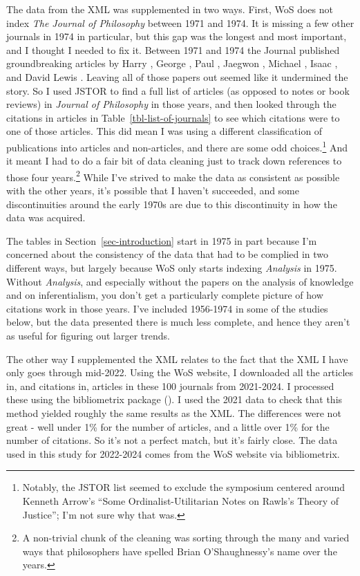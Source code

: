\documentclass[
]{ergoclass}
\begin{document}
The data from the XML was supplemented in two ways. First, WoS does not
index \emph{The Journal of Philosophy} between 1971 and 1974. It is
missing a few other journals in 1974 in particular, but this gap was the
longest and most important, and I thought I needed to fix it. Between
1971 and 1974 the Journal published groundbreaking articles by Harry
\citet{Frankfurt1971}, George \citet{Boolos1971}, Paul
\citet{Benacerraf1973}, Jaegwon \citet{Kim1973}, Michael
\citet{Friedman1974}, Isaac \citet{Levi1974}, and David Lewis
\citetext{\citeyear{Lewis1971cen}; \citeyear{Lewis1973ben}}. Leaving all
of those papers out seemed like it undermined the story. So I used JSTOR
to find a full list of articles (as opposed to notes or book reviews) in
\emph{Journal of Philosophy} in those years, and then looked through the
citations in articles in Table~\ref{tbl-list-of-journals} to see which
citations were to one of those articles. This did mean I was using a
different classification of publications into articles and non-articles,
and there are some odd choices.\footnote{Notably, the JSTOR list seemed
  to exclude the symposium centered around Kenneth Arrow's ``Some
  Ordinalist-Utilitarian Notes on Rawls's Theory of Justice''; I'm not
  sure why that was.} And it meant I had to do a fair bit of data
cleaning just to track down references to those four years.\footnote{A
  non-trivial chunk of the cleaning was sorting through the many and
  varied ways that philosophers have spelled Brian O'Shaughnessy's name
  over the years.} While I've strived to make the data as consistent as
possible with the other years, it's possible that I haven't succeeded,
and some discontinuities around the early 1970s are due to this
discontinuity in how the data was acquired.

The tables in Section~\ref{sec-introduction} start in 1975 in part
because I'm concerned about the consistency of the data that had to be
complied in two different ways, but largely because WoS only starts
indexing \emph{Analysis} in 1975. Without \emph{Analysis}, and
especially without the papers on the analysis of knowledge and on
inferentialism, you don't get a particularly complete picture of how
citations work in those years. I've included 1956-1974 in some of the
studies below, but the data presented there is much less complete, and
hence they aren't as useful for figuring out larger trends.

The other way I supplemented the XML relates to the fact that the XML I
have only goes through mid-2022. Using the WoS website, I downloaded all
the articles in, and citations in, articles in these 100 journals from
2021-2024. I processed these using the bibliometrix package
(\citet{bibliometrix}). I used the 2021 data to check that this method
yielded roughly the same results as the XML. The differences were not
great - well under 1\% for the number of articles, and a little over 1\%
for the number of citations. So it's not a perfect match, but it's
fairly close. The data used in this study for 2022-2024 comes from the
WoS website via bibliometrix.
\end{document}
